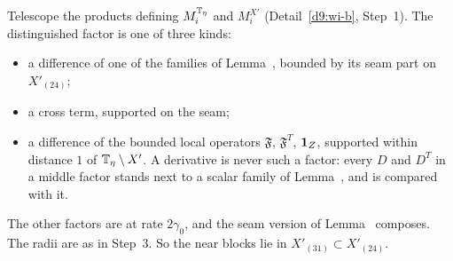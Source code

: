 \begin{detail}
\begin{step}
\end{step}
\begin{step}[(N3), seams]
Telescope the products defining $M_i^{\mathbb T_\eta}$ and $M_i^{X'}$ (Detail~\ref{d9:wi-b}, Step~1). The distinguished factor is one of three kinds:
\begin{itemize}
\item a difference of one of the families of Lemma~, bounded by its seam part on $X'_{(24)}$;
\item a cross term, supported on the seam;
\item a difference of the bounded local operators $\mathfrak F$, $\mathfrak F^T$, $\mathbf 1_Z$, supported within distance $1$ of $\mathbb T_\eta\setminus X'$. A derivative is never such a factor: every $D$ and $D^T$ in a middle factor stands next to a scalar family of Lemma~, and is compared with it.
\end{itemize}
The other factors are at rate $2\gamma_0$, and the seam version of Lemma~ composes. The radii are as in Step~3. So the near blocks lie in $X'_{(31)}\subset X'_{(24)}$.
\end{step}
\end{detail}

